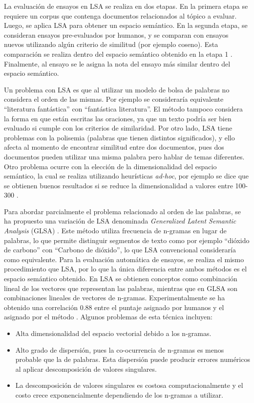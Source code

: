 \documentclass[12pt]{diicc}
\begin{document}
La evaluación de ensayos en LSA se realiza en dos etapas. En la primera etapa se requiere un corpus que contenga documentos relacionados al tópico a evaluar. Luego, se aplica LSA para obtener un espacio semántico. En la segunda etapa, se consideran ensayos pre-evaluados por humanos, y se comparan con ensayos nuevos utilizando algún criterio de similitud (por ejemplo coseno). Esta comparación se realiza dentro del espacio semántico obtenido en la etapa 1 \cite{t10}. Finalmente, al ensayo se le asigna la nota del ensayo más similar dentro del espacio semántico.

Un problema con LSA es que al utilizar un modelo de bolsa de palabras no considera el orden de las mismas. Por ejemplo se consideraría equivalente ``literatura fantástica'' con ``fantástica literatura''. El método tampoco considera la forma en que están escritas las oraciones, ya que  un texto podría ser bien evaluado si cumple con los criterios de similaridad. Por otro lado, LSA tiene problemas con la polisemia (palabras que tienen distintos significados), y ello afecta al momento de encontrar similitud entre dos documentos, pues dos documentos pueden utilizar una misma palabra pero hablar de temas diferentes. Otro problema ocurre con la elección de la dimensionalidad del espacio semántico, la cual se realiza utilizando heurísticas {\em ad-hoc}, por ejemplo se dice que se obtienen buenos resultados si se reduce la dimensionalidad a valores entre 100-300 \cite{t10}.

Para abordar parcialmente el problema relacionado al orden de las palabras, se ha propuesto una variación de LSA denominada {\em Generalized Latent Semantic Analysis} (GLSA) \cite{t13}. Este método utiliza frecuencia de n-gramas en lugar de palabras, lo que permite distinguir segmentos de texto como por ejemplo ``dióxido de carbono'' con ``Carbono de dióxido'', lo que LSA convencional consideraría como equivalente. Para la evaluación automática de ensayos, se realiza el mismo procedimiento que LSA, por lo que la única diferencia entre ambos métodos es el espacio semántico obtenido. En LSA se obtienen conceptos como combinación lineal de los vectores que representan las palabras, mientras que en GLSA son combinaciones lineales de vectores de n-gramas. Experimentalmente se ha obtenido una correlación 0.88 entre el puntaje asignado por humanos y el asignado por el método \cite{t13}. Algunos problemas de esta técnica incluyen:

\begin{itemize}
	\item Alta dimensionalidad del espacio vectorial debido a los n-gramas.
	\item Alto grado de dispersión, pues la co-ocurrencia de n-gramas es menos probable que la de palabras. Esta dispersión puede producir errores numéricos al aplicar descomposición de valores singulares.
	\item La descomposición de valores singulares es costosa computacionalmente y el costo crece exponencialmente dependiendo de los n-gramas a utilizar.
\end{itemize}
\end{document}
